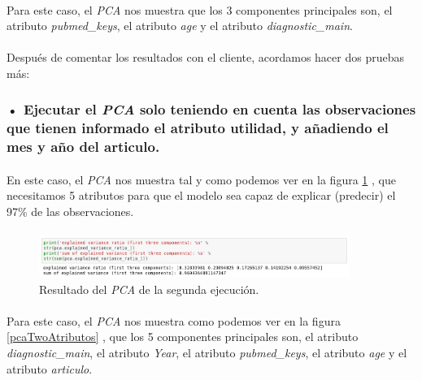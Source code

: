 \documentclass[10pt,a4paper,oneside]{book}
\begin{document}
\paragraph{}
Para este caso, el \textit{PCA} nos muestra que los 3 componentes principales son, el atributo \textit{pubmed\_keys}, el atributo \textit{age} y el atributo \textit{diagnostic\_main}.

\paragraph{}
Después de comentar los resultados con el cliente, acordamos hacer dos pruebas más:

\newpage
\subsubsection{• Ejecutar el \textit{PCA} solo teniendo en cuenta las observaciones que tienen informado el atributo utilidad, y añadiendo el mes y año del articulo.}

\paragraph{}
En este caso, el \textit{PCA} nos muestra tal y como podemos ver en la figura \ref{pcaTwoResult} , que necesitamos 5 atributos para que el modelo sea capaz de explicar (predecir) el 97\% de las observaciones.

\paragraph{}
\begin{figure}[!htb]
  \centering
    \includegraphics[width=0.9\textwidth]{images/metodologia_procesado_de_datos_pca2_result.png}
    \caption{Resultado del \textit{PCA} de la segunda ejecución.}
  \label{pcaTwoResult}
\end{figure}

\paragraph{}
Para este caso, el \textit{PCA} nos muestra como podemos ver en la figura \ref{pcaTwoAtributos} , que los 5 componentes principales son, el atributo \textit{diagnostic\_main}, el atributo \textit{Year}, el atributo \textit{pubmed\_keys}, el atributo \textit{age} y el atributo \textit{articulo}.
\end{document}
